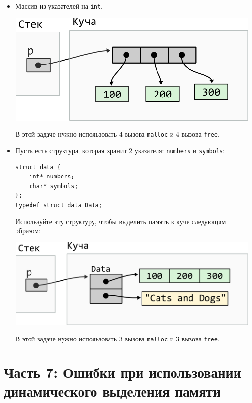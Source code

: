 \documentclass{article}
\begin{document}
\begin{itemize}
\item Массив из указателей на \texttt{int}.
\begin{center}
\includegraphics[scale=0.83]{../images/malloc_class_tasks/heap_pointer_array.png}
\end{center}
В этой задаче нужно использовать 4 вызова \texttt{malloc} и 4 вызова \texttt{free}.

\item Пусть есть структура, которая хранит 2 указателя: \texttt{numbers} и \texttt{symbols}:
\begin{lstlisting}
struct data {
    int* numbers;
    char* symbols;
};
typedef struct data Data;
\end{lstlisting}

Используйте эту структуру, чтобы выделить память в куче следующим образом:
\begin{center}
\includegraphics[scale=0.83]{../images/malloc_class_tasks/heap_struct_with_pointers.png}
\end{center}
В этой задаче нужно использовать 3 вызова \texttt{malloc} и 3 вызова \texttt{free}.
\end{itemize}


\newpage
\section*{Часть 7: Ошибки при использовании динамического выделения памяти}
\end{document}
